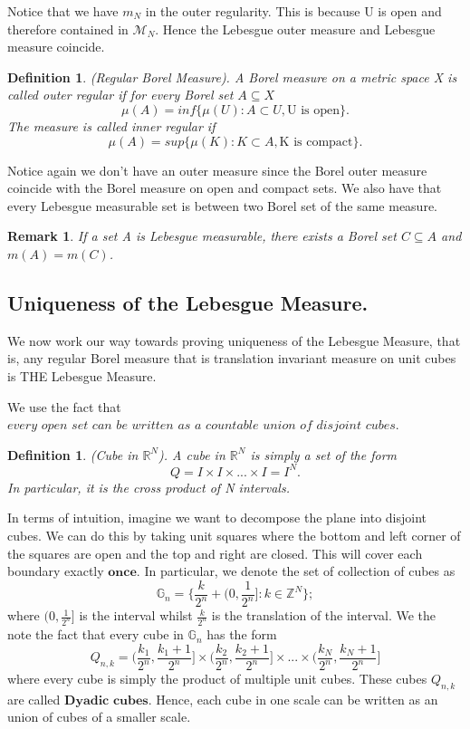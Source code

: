 \documentclass[twoside]{article}
\newtheorem{remark}[theorem]{Remark}
\newtheorem{definition}[theorem]{Definition}
\begin{document}
Notice that we have $m_N$ in the outer regularity. This is because U is open and therefore contained in $\mathcal{M}_N$. Hence the Lebesgue outer measure and Lebesgue measure coincide.


\begin{definition}(Regular Borel Measure). A Borel measure on a metric space X is called outer regular if for every Borel set $A \subseteq X$
$$
\mu(A) = inf\{\mu(U): A \subset U, \text{U is open}\}.
$$
The measure is called inner regular if
$$
\mu(A) = sup\{\mu(K): K \subset A, \text{K is compact}\}.
$$
\end{definition}

Notice again we don't have an outer measure since the Borel outer measure coincide with the Borel measure on open and compact sets. We also have that every Lebesgue measurable set is between two Borel set of the same measure.

\begin{remark}If a set A is Lebesgue measurable, there exists a Borel set $C \subseteq A$ and $m(A) = m(C)$.
\end{remark}

\subsection{Uniqueness of the Lebesgue Measure.}

We now work our way towards proving uniqueness of the Lebesgue Measure, that is, any regular Borel measure that is translation invariant measure on unit cubes is THE Lebesgue Measure. 

We use the fact that $\textit{every open set can be written as a countable union of disjoint cubes}$.

\begin{definition}
(Cube in $\mathbb{R}^N$). A cube in $\mathbb{R}^N$ is simply a set of the form
$$
Q = I \times I \times ... \times I = I^N.
$$
In particular, it is the cross product of N intervals.
\end{definition}

In terms of intuition, imagine we want to decompose the plane into disjoint cubes. We can do this by taking unit squares where the bottom and left corner of the squares are open and the top and right are closed. This will cover each boundary exactly $\textbf{once}$. In particular, we denote the set of collection of cubes as
$$
\mathbb{G}_n = \{\frac{k}{2^n} + (0, \frac{1}{2^n}] : k \in \mathbb{Z}^N\};
$$
where $(0, \frac{1}{2^n}]$ is the interval whilst $\frac{k}{2^n}$ is the translation of the interval. We the note the fact that every cube in $\mathbb{G}_n$ has the form
$$
Q_{n,k} = (\frac{k_1}{2^n},\frac{k_1+1}{2^n}] \times (\frac{k_2}{2^n},\frac{k_2+1}{2^n}] \times ... \times (\frac{k_N}{2^n},\frac{k_N+1}{2^n}]
$$
where every cube is simply the product of multiple unit cubes. These cubes $Q_{n,k}$ are called $\textbf{Dyadic cubes}$. Hence, each cube in one scale can be written as an union of cubes of a smaller scale. 
\end{document}
